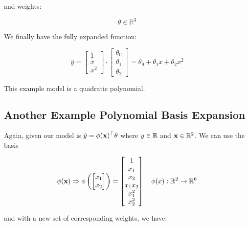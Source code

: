 and weights:

\begin{equation}
    \theta \in \mathbb{R}^3
\end{equation}

We finally have the fully expanded function:

\begin{equation}
    \hat{y} = \begin{bmatrix} 1 \\ x \\ x^2 \end{bmatrix} \cdot \begin{bmatrix} \theta_0 \\ \theta_1 \\ \theta_2 \end{bmatrix} = \theta_0 + \theta_1 x + \theta_2 x^2
\end{equation}

This example model is a quadratic polynomial. 

\subsection{Another Example Polynomial Basis Expansion}
Again, given our model is $\hat{y} = \phi(\mathbf{x})^\top \theta$ where $y \in \mathbb{R} $ and $\mathbf{x} \in \mathbb{R}^2$. We can use the basis

\begin{equation} 
    \phi(\mathbf{x}) \Rightarrow \phi\left(\begin{bmatrix} x_1 \\ x_2 \end{bmatrix}\right) = \begin{bmatrix} 1 \\ x_1 \\ x_2 \\ x_1x_2 \\ x_1^2 \\ x_2^2 \end{bmatrix} \quad \phi(x) : \mathbb{R}^2 \rightarrow \mathbb{R}^6
\end{equation}

and with a new set of corresponding weights, we have:

